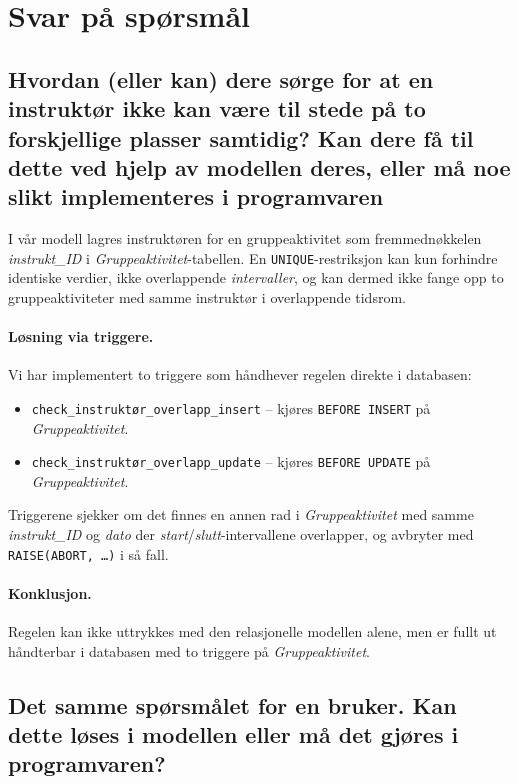 \section{Svar på spørsmål}

\subsection{Hvordan (eller kan) dere sørge for at en instruktør ikke kan være til stede på to
forskjellige plasser samtidig? Kan dere få til dette ved hjelp av modellen deres,
eller må noe slikt implementeres i programvaren}

I vår modell lagres instruktøren for en gruppeaktivitet som fremmednøkkelen
\textit{instrukt\_ID} i \textit{Gruppeaktivitet}-tabellen.
En \texttt{UNIQUE}-restriksjon kan kun forhindre identiske verdier, ikke
overlappende \emph{intervaller}, og kan dermed ikke fange opp to
gruppeaktiviteter med samme instruktør i overlappende tidsrom.

\paragraph{Løsning via triggere.}
Vi har implementert to triggere som håndhever regelen direkte i databasen:
\begin{itemize}
    \item \texttt{check\_instruktør\_overlapp\_insert} –
          kjøres \texttt{BEFORE INSERT} på \textit{Gruppeaktivitet}.
    \item \texttt{check\_instruktør\_overlapp\_update} –
          kjøres \texttt{BEFORE UPDATE} på \textit{Gruppeaktivitet}.
\end{itemize}
Triggerene sjekker om det finnes en annen rad i \textit{Gruppeaktivitet}
med samme \textit{instrukt\_ID} og \textit{dato} der
\textit{start}/\textit{slutt}-intervallene overlapper,
og avbryter med \texttt{RAISE(ABORT, \ldots)} i så fall.

\paragraph{Konklusjon.}
Regelen kan ikke uttrykkes med den relasjonelle modellen alene, men er
fullt ut håndterbar i databasen med to triggere på \textit{Gruppeaktivitet}.

\subsection{Det samme spørsmålet for en bruker. Kan dette løses i modellen eller må det
gjøres i programvaren?}

